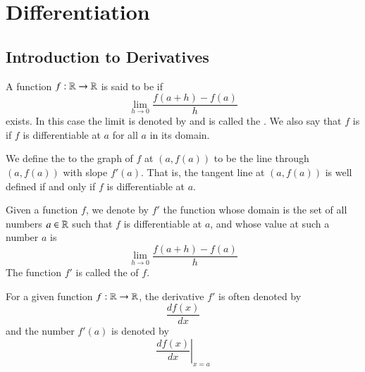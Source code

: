 \chapter{Differentiation}\label{Diff}

\section{Introduction to Derivatives}


\begin{definition}[Differentiability]
    A function $f:\mathbb R\rightarrow \mathbb R$ is said to be  if \begin{equation}
        \lim\limits_{h\rightarrow 0}\frac{f(a+h) - f(a)}{h}
    \end{equation}
    exists. In this case the limit is denoted by  and is called the . We also say that $f$ is  if $f$ is differentiable at $a$ for all $a$ in its domain.
\end{definition}

\begin{definition}
    We define the  to the graph of $f$ at $(a,f(a))$ to be the line through $(a,f(a))$ with slope $f'(a)$. That is, the tangent line at $(a,f(a))$ is well defined if and only if $f$ is differentiable at $a$.
\end{definition}


\begin{remark}
    Given a function $f$, we denote by $f'$ the function whose domain is the set of all numbers $a \in \mathbb R$ such that $f$ is differentiable at $a$, and whose value at such a number $a$ is \begin{equation}
        \lim\limits_{h\rightarrow 0}\frac{f(a+h) - f(a)}{h}
    \end{equation}
    The function $f'$ is called the  of $f$.
\end{remark}

\begin{note}
    For a given function $f:\mathbb R\rightarrow \mathbb R$, the derivative $f'$ is often denoted by \begin{equation}
        \frac{df(x)}{dx}
    \end{equation}
    and the number $f'(a)$ is denoted by \begin{equation}
        \left.\frac{df(x)}{dx}\right\vert_{x=a}
    \end{equation}
\end{note}


